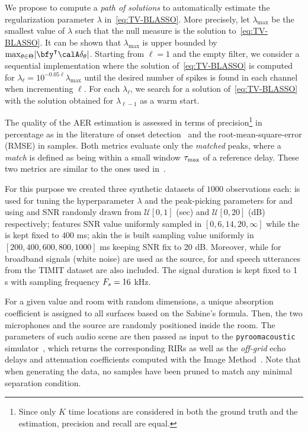 We propose to compute a \textit{path of solutions} to automatically estimate the regularization parameter $\lambda$  in~\eqref{eq:TV-BLASSO}.
More precisely, let $\lambda_{\max}$ be the smallest value of $\lambda$ such that the null measure is the solution to~\eqref{eq:TV-BLASSO}.
It can be shown that $\lambda_{\max}$ is upper bounded by $\max_{\theta\in\Theta} \kvbar{\bfy^\intercal\opObs\delta_\theta}$.
Starting from $\ell=1$ and the empty filter, we consider a sequential implementation where the solution of~\eqref{eq:TV-BLASSO} is computed for $\lambda_\ell= 10^{-0.05\ell}\lambda_{\max}$ until the desired number of spikes is found in each channel when incrementing $\ell$.
For each $\lambda_\ell$, we search for a solution of~\eqref{eq:TV-BLASSO} with the solution obtained for $\lambda_{\ell-1}$ as a warm start.

The quality of the AER estimation is assessed in terms of precision\footnote{Since only $K$ time locations are considered in both the ground truth and the estimation, precision and recall are equal.} in percentage as in the literature of onset detection~\cite{Bock2012} and the root-mean-square-error (RMSE) in samples.
Both metrics evaluate only the \textit{matched} peaks, where a \textit{match} is defined as being within a small window $\tau_\text{max}$ of a reference delay. These two metrics are similar to the ones used in~\cite{Crocco2015}.

For this purpose we created three synthetic datasets of $1000$ observations each:
\dsetValid{} is used for tuning the hyperparameter $\lambda$ and the peak-picking parameters for \algoCrocco{} and \algoBsn{} using \RT{} and SNR randomly drawn from $\mathcal{U}[0, 1]$ (sec) and $\mathcal{U}[0, 20]$ (dB) respectively; \dsetSNR{} features SNR value uniformly sampled in $[0, 6, 14, 20, \infty]$ while the \RT{} is kept fixed to $400$ ms; akin the \dsetRT{} is built sampling \RT{} value uniformly in $[200, 400, 600, 800, 1000]$ ms keeping SNR fix to 20 dB.
Moreover, while for \dsetValid{} broadband signals (white noise) are used as the source, for \dsetSNR{} and \dsetRT{} speech utterances from the TIMIT dataset are also included.
The signal duration is kept fixed to 1 s with sampling frequency $F_s = 16$ kHz.

For a given \RT{} value and room with random dimensions, a unique absorption coefficient is assigned to all surfaces based on the Sabine's formula. Then, the two microphones and the source are randomly positioned inside the room. The parameters of such audio scene are then passed as input to the \texttt{pyroomacoustic} simulator~\cite{Scheibler_2018}, which returns the corresponding RIRs as well as the \textit{off-grid} echo delays and attenuation coefficients computed with the Image Method~\cite{Allen1979}.
Note that when generating the data, no samples have been pruned to match any minimal separation condition.

